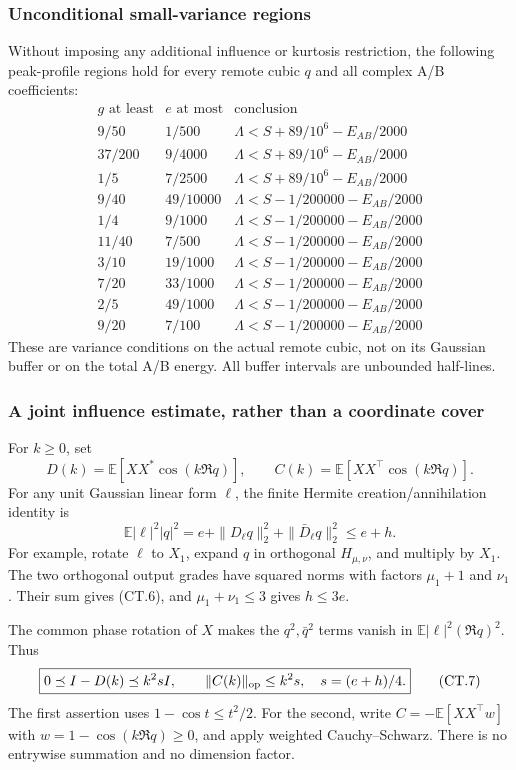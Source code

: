 \subsubsection{Unconditional small-variance regions}
Without imposing any additional influence or kurtosis restriction,
the following peak-profile regions hold for every remote cubic \(q\)
and all complex A/B coefficients:
\[
\begin{array}{c|c|c}
 g\text{ at least}&e\text{ at most}&\text{conclusion}\\ \hline
 9/50&1/500&\Lambda<S+89/10^6-E_{AB}/2000\\
 37/200&9/4000&\Lambda<S+89/10^6-E_{AB}/2000\\
 1/5&7/2500&\Lambda<S+89/10^6-E_{AB}/2000\\ \hline
 9/40&49/10000&\Lambda<S-1/200000-E_{AB}/2000\\
 1/4&9/1000&\Lambda<S-1/200000-E_{AB}/2000\\
 11/40&7/500&\Lambda<S-1/200000-E_{AB}/2000\\
 3/10&19/1000&\Lambda<S-1/200000-E_{AB}/2000\\
 7/20&33/1000&\Lambda<S-1/200000-E_{AB}/2000\\
 2/5&49/1000&\Lambda<S-1/200000-E_{AB}/2000\\
 9/20&7/100&\Lambda<S-1/200000-E_{AB}/2000
\end{array}
\tag{CT.5}
\]
These are variance conditions on the actual remote cubic, not on its
Gaussian buffer or on the total A/B energy. All buffer intervals are
unbounded half-lines.

\subsubsection{A joint influence estimate, rather than a coordinate cover}
For \(k\ge0\), set
\[
 D(k)=\mathbb E[XX^*\cos(k\Re q)],\qquad
 C(k)=\mathbb E[XX^\top\cos(k\Re q)].
\]
For any unit Gaussian linear form \(\ell\), the finite Hermite
creation/annihilation identity is
\[
 \mathbb E|\ell|^2|q|^2
 =e+\|D_\ell q\|_2^2+\|\bar D_\ell q\|_2^2\le e+h.
 \tag{CT.6}
\]
For example, rotate \(\ell\) to \(X_1\), expand \(q\) in orthogonal
\(H_{\mu,\nu}\), and multiply by \(X_1\). The two orthogonal output
grades have squared norms with factors \(\mu_1+1\) and \(\nu_1\).
Their sum gives (CT.6), and \(\mu_1+\nu_1\le3\) gives \(h\le3e\).

The common phase rotation of \(X\) makes the \(q^2,\bar q^2\) terms
vanish in \(\mathbb E|\ell|^2(\Re q)^2\). Thus
\[
 \boxed{0\preceq I-D(k)\preceq k^2sI,\qquad
        \|C(k)\|_{\rm op}\le k^2s,\quad s=(e+h)/4.}
 \tag{CT.7}
\]
The first assertion uses \(1-\cos t\le t^2/2\).
For the second, write \(C=-\mathbb E[XX^\top w]\) with
\(w=1-\cos(k\Re q)\ge0\), and apply weighted Cauchy--Schwarz.
There is no entrywise summation and no dimension factor.

